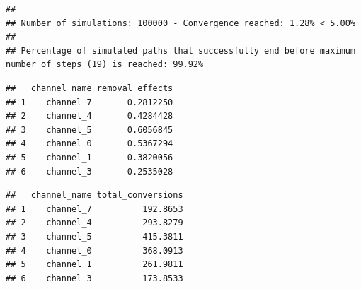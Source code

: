 \documentclass[
]{book}
\newenvironment{Shaded}{\begin{snugshade}}{\end{snugshade}}
\newcommand{\NormalTok}[1]{#1}
\newcommand{\SpecialCharTok}[1]{\textcolor[rgb]{0.00,0.00,0.00}{#1}}
\begin{document}
\begin{verbatim}
## 
## Number of simulations: 100000 - Convergence reached: 1.28% < 5.00%
## 
## Percentage of simulated paths that successfully end before maximum number of steps (19) is reached: 99.92%
\end{verbatim}

\begin{Shaded}
\end{Shaded}

\begin{verbatim}
##   channel_name removal_effects
## 1    channel_7       0.2812250
## 2    channel_4       0.4284428
## 3    channel_5       0.6056845
## 4    channel_0       0.5367294
## 5    channel_1       0.3820056
## 6    channel_3       0.2535028
\end{verbatim}

\begin{Shaded}
\end{Shaded}

\begin{verbatim}
##   channel_name total_conversions
## 1    channel_7          192.8653
## 2    channel_4          293.8279
## 3    channel_5          415.3811
## 4    channel_0          368.0913
## 5    channel_1          261.9811
## 6    channel_3          173.8533
\end{verbatim}
\end{document}
